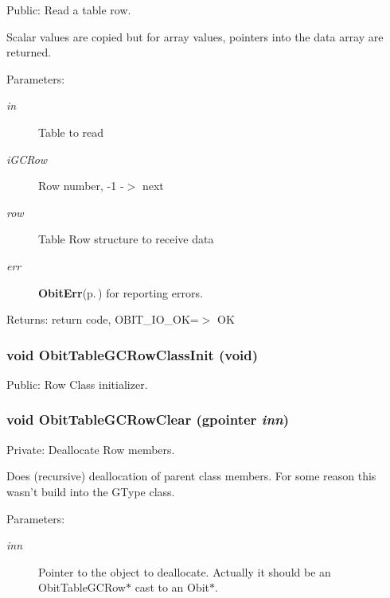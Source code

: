 Public: Read a table row. 

Scalar values are copied but for array values, pointers into the data array are returned. \begin{Desc}
\item[Parameters:]
\begin{description}
\item[{\em in}]Table to read \item[{\em i\-GCRow}]Row number, -1 -$>$ next \item[{\em row}]Table Row structure to receive data \item[{\em err}]{\bf Obit\-Err}{\rm (p.\,\pageref{structObitErr})} for reporting errors. \end{description}
\end{Desc}
\begin{Desc}
\item[Returns:]return code, OBIT\_\-IO\_\-OK=$>$ OK \end{Desc}
\subsubsection{\setlength{\rightskip}{0pt plus 5cm}void Obit\-Table\-GCRow\-Class\-Init (void)}\label{ObitTableGC_8c_a26}


Public: Row Class initializer. 

\subsubsection{\setlength{\rightskip}{0pt plus 5cm}void Obit\-Table\-GCRow\-Clear (gpointer {\em inn})}\label{ObitTableGC_8c_a7}


Private: Deallocate Row members. 

Does (recursive) deallocation of parent class members. For some reason this wasn't build into the GType class. \begin{Desc}
\item[Parameters:]
\begin{description}
\item[{\em inn}]Pointer to the object to deallocate. Actually it should be an Obit\-Table\-GCRow$\ast$ cast to an Obit$\ast$. \end{description}
\end{Desc}
